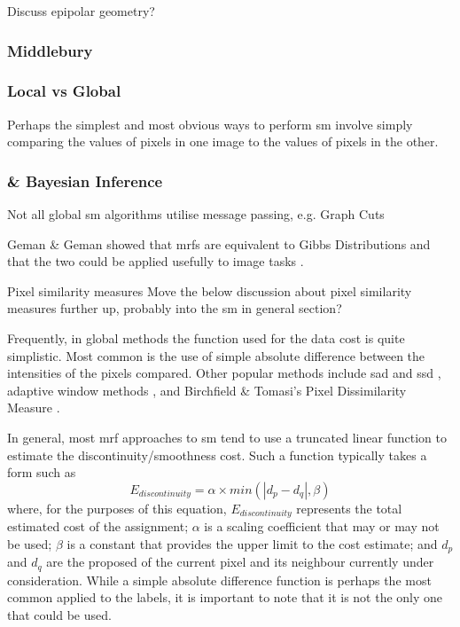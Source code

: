 \begin{anfxnote}{}
    Discuss epipolar geometry?
\end{anfxnote}

\subsubsection{Middlebury}

\subsubsection{Local vs Global}

Perhaps the simplest and most obvious ways to perform \gls{sm} involve simply comparing the values of pixels in one image to the values of pixels in the other.

\subsubsection{ \& Bayesian Inference}

Not all global \gls{sm} algorithms utilise message passing, e.g. Graph Cuts \cite{Kolmogorov2001,Tappen2003}

Geman \& Geman \cite{Geman1984} showed that \glspl{mrf} are equivalent to Gibbs Distributions and that the two could be applied usefully to image tasks \cite{Gimelfarb1999}.

\begin{anfxwarning}{Pixel similarity measures}
    Move the below discussion about pixel similarity measures further up, probably into the \gls{sm} in general section?
\end{anfxwarning}

Frequently, in global methods the function used for the data cost is quite simplistic.  Most common is the use of simple absolute difference between the intensities of the pixels compared.  Other popular methods include \gls{sad} and \gls{ssd} \fxerror[inline]{[ref]}, adaptive window methods \cite{Yoon2005,Yoon2006}, and Birchfield \& Tomasi's Pixel Dissimilarity Measure \cite{Birchfield1998}.

In general, most \gls{mrf} approaches to \gls{sm} tend to use a truncated linear function to estimate the discontinuity/smoothness cost.  Such a function typically takes a form such as \[ E_{discontinuity} = \alpha \times min(| d_p - d_q |, \beta) \] where, for the purposes of this equation, \(E_{discontinuity}\) represents the total estimated cost of the assignment; \(\alpha\) is a scaling coefficient that may or may not be used; \(\beta\) is a constant that provides the upper limit to the cost estimate; and \(d_p\) and \(d_q\) are the proposed  of the current pixel and its neighbour currently under consideration.  While a simple absolute difference function is perhaps the most common applied to the labels, it is important to note that it is not the only one that could be used.  

